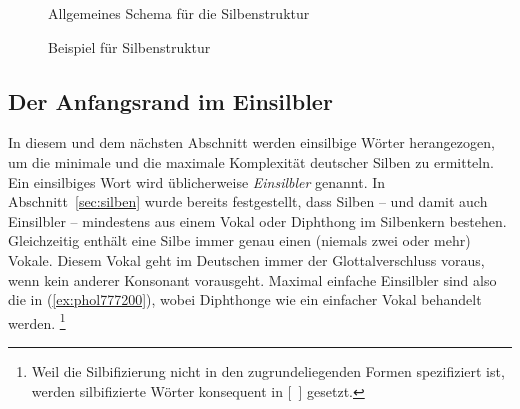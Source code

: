 
\begin{figure}[!htbp]
  \centering
  \caption{Allgemeines Schema für die Silbenstruktur}
  \label{fig:silbenstruktur}
\end{figure}

\newcommand{\ThePhonStr}{  
}

\begin{figure}[!htbp]
  \centering
  \ThePhonStr
  \caption{Beispiel für Silbenstruktur}
  \label{fig:phonstr}
\end{figure}


\subsection{Der Anfangsrand im Einsilbler}

\label{sec:anfangsrandimeinsilbler}

In diesem und dem nächsten Abschnitt werden einsilbige Wörter herangezogen, um die minimale und die maximale Komplexität deutscher Silben zu ermitteln.
Ein einsilbiges Wort wird üblicherweise \textit{Einsilbler} genannt.
In Abschnitt~\ref{sec:silben} wurde bereits festgestellt, dass Silben -- und damit auch Einsilbler -- mindestens aus einem Vokal oder Diphthong im Silbenkern bestehen.
Gleichzeitig enthält eine Silbe immer genau einen (niemals zwei oder mehr) Vokale.
Diesem Vokal geht im Deutschen immer der Glottalverschluss voraus, wenn kein anderer Konsonant vorausgeht.
Maximal einfache Einsilbler sind also die in (\ref{ex:phol777200}), wobei Diphthonge wie ein einfacher Vokal behandelt werden.%
\footnote{Weil die Silbifizierung nicht in den zugrundeliegenden Formen spezifiziert ist, werden silbifizierte Wörter konsequent in [~] gesetzt.}

